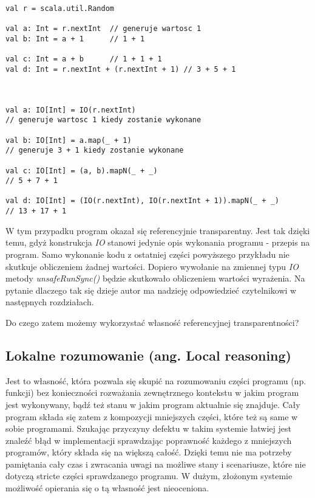 \documentclass[../main.tex]{subfiles}
\begin{document}
\begin{lstlisting}
val r = scala.util.Random

val a: Int = r.nextInt  // generuje wartosc 1
val b: Int = a + 1      // 1 + 1

val c: Int = a + b      // 1 + 1 + 1
val d: Int = r.nextInt + (r.nextInt + 1) // 3 + 5 + 1



val a: IO[Int] = IO(r.nextInt) 
// generuje wartosc 1 kiedy zostanie wykonane

val b: IO[Int] = a.map(_ + 1) 
// generuje 3 + 1 kiedy zostanie wykonane

val c: IO[Int] = (a, b).mapN(_ + _) 
// 5 + 7 + 1

val d: IO[Int] = (IO(r.nextInt), IO(r.nextInt + 1)).mapN(_ + _) 
// 13 + 17 + 1

\end{lstlisting}
W tym przypadku program okazał się referencyjnie transparentny. Jest tak dzięki temu, gdyż konstrukcja \textit{IO} stanowi jedynie opis wykonania programu - przepis na program. Samo wykonanie kodu z ostatniej części powyższego przykładu nie skutkuje obliczeniem żadnej wartości. Dopiero wywołanie na zmiennej typu \textit{IO} metody \textit{unsafeRunSync()} będzie skutkowało obliczeniem wartości wyrażenia. Na pytanie dlaczego tak się dzieje autor ma nadzieję odpowiedzieć czytelnikowi w następnych rozdziałach.


Do czego zatem możemy wykorzystać własność referencyjnej transparentności?

\subsection{Lokalne rozumowanie (ang. Local reasoning)}
Jest to własność, która pozwala się skupić na rozumowaniu części programu (np. funkcji) bez konieczności rozważania zewnętrznego kontekstu w jakim program jest wykonywany, bądź też stanu w jakim program aktualnie się znajduje. Cały program składa się zatem z kompozycji mniejszych części, które też są same w sobie programami. Szukając przyczyny defektu w takim systemie łatwiej jest znaleźć błąd w implementacji sprawdzając poprawność każdego z mniejszych programów, który składa się na większą całość. Dzięki temu nie ma potrzeby pamiętania cały czas i zwracania uwagi na możliwe stany i scenariusze, które nie dotyczą stricte części sprawdzanego programu. W dużym, złożonym systemie możliwość opierania się o tą własność jest nieoceniona.
\end{document}
